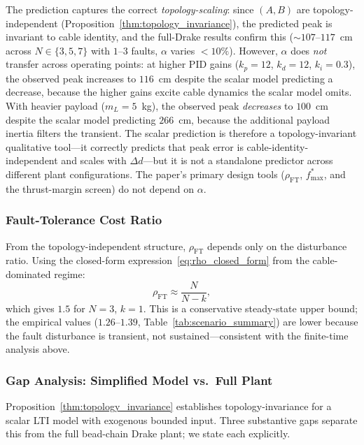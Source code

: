 The prediction captures the correct \emph{topology-scaling}: since $(A, B)$ are topology-independent (Proposition~\ref{thm:topology_invariance}), the predicted peak is invariant to cable identity, and the full-Drake results confirm this (${\sim}107$--$117$~cm across $N \in \{3,5,7\}$ with $1$--$3$ faults, $\alpha$ varies $<10\%$). However, $\alpha$ does \emph{not} transfer across operating points: at higher PID gains ($k_p{=}12$, $k_d{=}12$, $k_i{=}0.3$), the observed peak increases to $116$~cm despite the scalar model predicting a decrease, because the higher gains excite cable dynamics the scalar model omits. With heavier payload ($m_L = 5$~kg), the observed peak \emph{decreases} to $100$~cm despite the scalar model predicting $266$~cm, because the additional payload inertia filters the transient. The scalar prediction is therefore a topology-invariant qualitative tool---it correctly predicts that peak error is cable-identity-independent and scales with $\Delta d$---but it is not a standalone predictor across different plant configurations. The paper's primary design tools ($\rho_{\mathrm{FT}}$, $f_{\max}^*$, and the thrust-margin screen) do not depend on $\alpha$.

\subsubsection{Fault-Tolerance Cost Ratio}

From the topology-independent structure, $\rho_{\mathrm{FT}}$ depends only on the disturbance ratio. Using the closed-form expression~\eqref{eq:rho_closed_form} from the cable-dominated regime:
\begin{equation}\label{eq:rho_corollary}
  \rho_{\mathrm{FT}} \approx \frac{N}{N{-}k},
\end{equation}
which gives $1.5$ for $N{=}3$, $k{=}1$. This is a conservative steady-state upper bound; the empirical values ($1.26$--$1.39$, Table~\ref{tab:scenario_summary}) are lower because the fault disturbance is transient, not sustained---consistent with the finite-time analysis above.

\subsubsection{Gap Analysis: Simplified Model vs.\ Full Plant}

Proposition~\ref{thm:topology_invariance} establishes topology-invariance for a scalar LTI model with exogenous bounded input. Three substantive gaps separate this from the full bead-chain Drake plant; we state each explicitly.

